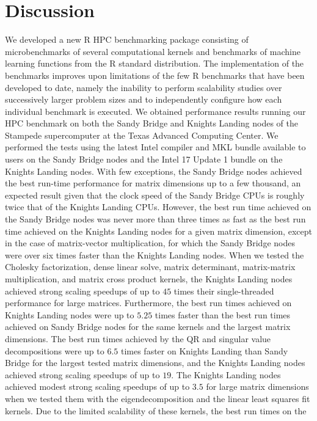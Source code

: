 \section{Discussion}
We developed a new R HPC benchmarking package consisting of microbenchmarks of
  several computational kernels and benchmarks of machine learning functions
  from the R standard distribution.
The implementation of the benchmarks improves upon limitations of the few R
  benchmarks that have been developed to date, namely the inability to perform
  scalability studies over successively larger problem sizes and to
  independently configure how each individual benchmark is executed.
We obtained performance results running our HPC benchmark on both the Sandy
  Bridge and Knights Landing nodes of the Stampede supercomputer at the Texas
  Advanced Computing Center.
We performed the tests using the latest Intel compiler and MKL bundle available
  to users on the Sandy Bridge nodes and the Intel 17 Update 1 bundle on the
  Knights Landing nodes.
With few exceptions, the Sandy Bridge nodes achieved the best run-time
  performance for matrix dimensions up to a few thousand, an expected result
  given that the clock speed of the Sandy Bridge CPUs is roughly twice that of
  the Knights Landing CPUs.
However, the best run time achieved on the Sandy Bridge nodes was never more
  than three times as fast as the best run time achieved on the Knights Landing
  nodes for a given matrix dimension, except in the case of matrix-vector
  multiplication, for which the Sandy Bridge nodes were over six times faster
  than the Knights Landing nodes.
When we tested the Cholesky factorization, dense linear solve, matrix
  determinant, matrix-matrix multiplication, and matrix cross product kernels,
  the Knights Landing nodes achieved strong scaling speedups of up to $45$ times
  their single-threaded performance for large matrices.
Furthermore, the best run times achieved on Knights Landing nodes were up to
  $5.25$ times faster than the best run times achieved on Sandy Bridge nodes for
  the same kernels and the largest matrix dimensions.
The best run times achieved by the QR and singular value decompositions were up
  to $6.5$ times faster on Knights Landing than Sandy Bridge for the largest
  tested matrix dimensions, and the Knights Landing nodes achieved strong
  scaling speedups of up to $19$.
The Knights Landing nodes achieved modest strong scaling speedups of up to $3.5$
  for large matrix dimensions when we tested them with the eigendecomposition
  and the linear least squares fit kernels.
Due to the limited scalability of these kernels, the best run times on the

